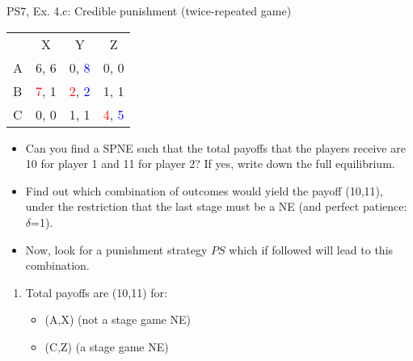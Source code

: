 \begin{frame}{PS7, Ex. 4.c: Credible punishment (twice-repeated game)}
    \vspace{-2pt}
    \begin{table}
      \begin{tabular}{l|c|c|c|}
        \multicolumn{1}{c}{} & \multicolumn{1}{c}{X} & \multicolumn{1}{c}{Y} & \multicolumn{1}{c}{Z}\\\cline{2-4}
        A   & 6, 6 &  0, \textcolor{blue}{8} &  0, 0  \\\cline{2-4}
        B & \textcolor{red}{7}, 1  & \textcolor{red}{2}, \textcolor{blue}{2} &  1, 1  \\\cline{2-4}
        C & 0, 0  & 1, 1 &  \textcolor{red}{4}, \textcolor{blue}{5}  \\\cline{2-4}
      \end{tabular}
    \end{table}
    \vspace{-4pt}
    \begin{itemize}
        \item[(c)] Can you find a SPNE such that the total payoffs that the players receive are 10 for player 1 and 11 for player 2? If yes, write down the full equilibrium.
    \end{itemize}
    \vspace{-8pt}
    \begin{multicols}{2}
      \begin{itemize}
        \item[(Step a)] Find out which combination of outcomes would yield the payoff (10,11), under the restriction that the last stage must be a NE (and perfect patience: $\delta$=1).
        \item[(Step b)] Now, look for a punishment strategy $PS$ which if followed will lead to this combination.
      \end{itemize}
      \vspace{-6pt}
      \vfill\null\columnbreak
      \begin{enumerate}
        \item[a] Total payoffs are (10,11) for:
        \begin{itemize}\normalsize
          \item[t=1:] (A,X) (not a stage game NE)
          \item[t=2:] (C,Z) (a stage game NE)
        \end{itemize}
      \end{enumerate}
      \vspace{-14pt}
      \vspace{-22pt}
      \vfill\null
    \end{multicols}
\end{frame}


